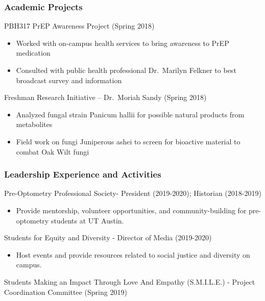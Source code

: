\documentclass[]{article}
\providecommand{\tightlist}{%
  \setlength{\itemsep}{0pt}\setlength{\parskip}{0pt}}
\begin{document}
\subsubsection{Academic Projects}\label{academic-projects}

PBH317 PrEP Awareness Project (Spring 2018)

\begin{itemize}
\tightlist
\item
  Worked with on-campus health services to bring awareness to PrEP
  medication
\item
  Consulted with public health professional Dr.~Marilyn Felkner to best
  broadcast survey and information
\end{itemize}

Freshman Research Initiative -- Dr.~Moriah Sandy (Spring 2018)

\begin{itemize}
\tightlist
\item
  Analyzed fungal strain Panicum hallii for possible natural products
  from metabolites
\item
  Field work on fungi Juniperous ashei to screen for bioactive material
  to combat Oak Wilt fungi
\end{itemize}

\subsubsection{Leadership Experience and
Activities}\label{leadership-experience-and-activities}

Pre-Optometry Professional Society- President (2019-2020); Historian
(2018-2019)

\begin{itemize}
\tightlist
\item
  Provide mentorship, volunteer opportunities, and community-building
  for pre-optometry students at UT Austin.
\end{itemize}

Students for Equity and Diversity - Director of Media (2019-2020)

\begin{itemize}
\tightlist
\item
  Host events and provide resources related to social justice and
  diversity on campus.
\end{itemize}

Students Making an Impact Through Love And Empathy (S.M.I.L.E.) -
Project Coordination Committee (Spring 2019)
\end{document}
